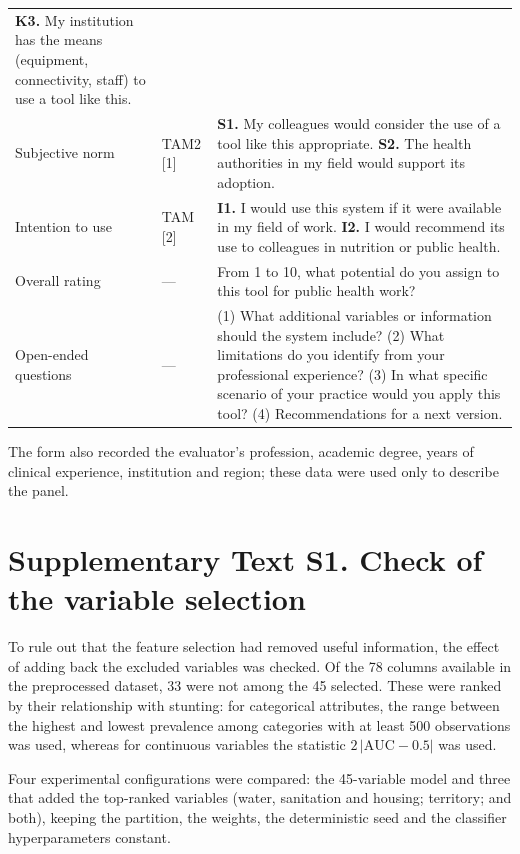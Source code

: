 \documentclass[11pt]{article}
\begin{document}
\begin{table}[h]
\begin{tabularx}{\linewidth}{@{}p{3.2cm}p{1.65cm}L@{}}
\textbf{K3.} My institution has the means (equipment, connectivity, staff) to use a tool like this. \\
Subjective norm & TAM2 [1] &
\textbf{S1.} My colleagues would consider the use of a tool like this appropriate.\newline
\textbf{S2.} The health authorities in my field would support its adoption. \\
Intention to use & TAM [2] &
\textbf{I1.} I would use this system if it were available in my field of work.\newline
\textbf{I2.} I would recommend its use to colleagues in nutrition or public health. \\
\midrule
Overall rating & --- & From 1 to 10, what potential do you assign to this tool for public health work? \\
Open-ended questions & --- &
(1) What additional variables or information should the system include?
(2) What limitations do you identify from your professional experience?
(3) In what specific scenario of your practice would you apply this tool?
(4) Recommendations for a next version. \\
\bottomrule
\end{tabularx}

\vspace{3pt}
{\footnotesize The form also recorded the evaluator's profession, academic degree, years of clinical experience,
institution and region; these data were used only to describe the panel.}
\end{table}

\section*{Supplementary Text S1. Check of the variable selection}

To rule out that the feature selection had removed useful information, the effect of adding back the excluded
variables was checked. Of the 78 columns available in the preprocessed dataset, 33 were not among the 45 selected.
These were ranked by their relationship with stunting: for categorical attributes, the range between the highest and
lowest prevalence among categories with at least 500 observations was used, whereas for continuous variables the
statistic $2\,|\mathrm{AUC} - 0.5|$ was used.

Four experimental configurations were compared: the 45-variable model and three that added the top-ranked variables
(water, sanitation and housing; territory; and both), keeping the partition, the weights, the deterministic seed and
the classifier hyperparameters constant.
\end{document}
